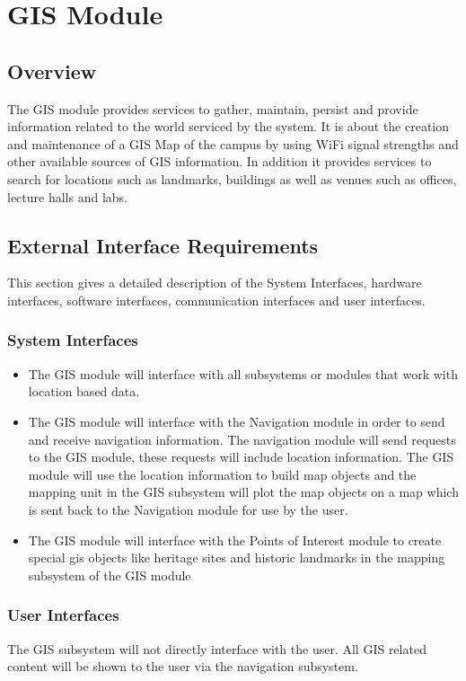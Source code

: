 
	\section{GIS Module}

\subsection{Overview}
The GIS module provides services to gather, maintain, persist and provide information related to the world serviced by the system. It is about the creation and maintenance of a GIS Map of the
campus by using WiFi signal strengths and other available sources of GIS information. In addition it provides services to search for locations such as landmarks, buildings as well as venues such as offices, lecture halls and labs.

\subsection{External Interface Requirements}
This section gives a detailed description of the System Interfaces, hardware interfaces, software interfaces, communication interfaces and user interfaces.
\subsubsection{System Interfaces}
\begin{itemize}
\item The GIS module will interface with all subsystems or modules that work with location based data.

\item The GIS module will interface with the Navigation module in order to send and receive navigation information. The navigation module will send requests to the GIS module, these requests will include location information. The GIS module will use the location information to build map objects and the mapping unit in the GIS subsystem will plot the map objects on a map which is sent back to the Navigation module for use by the user.

\item The GIS module will interface with the Points of Interest module to create special gis objects like heritage sites and historic landmarks in the mapping subsystem of the GIS module

\end{itemize}


\subsubsection{User Interfaces}
The GIS subsystem will not directly interface with the user. All GIS related content will be shown to the user via the navigation subsystem.


